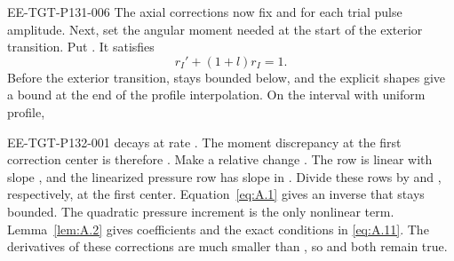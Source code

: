 \begin{EESegment}{EE-TGT-P131-006}
The axial corrections now fix  and
 for each trial pulse amplitude. Next, set the angular moment
needed at the start of the exterior transition. Put
. It satisfies
\[
r_I'+(1+l)r_I=1.
\]
Before the exterior transition,  stays bounded below, and the
explicit shapes give a  bound
 at the end of the profile interpolation. On the
interval with uniform profile, 
\end{EESegment}
%
\begin{EESegment}{EE-TGT-P132-001}
 decays at rate
. The moment discrepancy at the first correction center
is therefore . Make a
relative change . The
 row is linear with slope
, and the linearized pressure row has slope
 in . Divide these rows by
 and , respectively, at the first
center. Equation~\eqref{eq:A.1} gives an inverse that stays bounded. The quadratic
pressure increment is the only nonlinear term. Lemma~\ref{lem:A.2} gives coefficients
 and the exact
conditions in \eqref{eq:A.11}. The  derivatives of these
corrections are much smaller than , so
 and  both remain true.
\end{EESegment}

